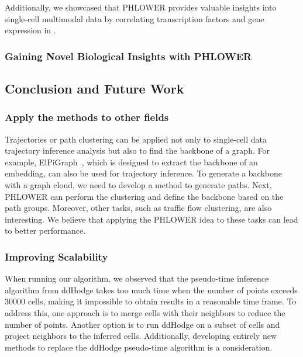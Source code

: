 Additionally, we showcased that PHLOWER provides valuable insights into single-cell multimodal data by correlating transcription factors and gene expression in .


\subsubsection{Gaining Novel Biological Insights with PHLOWER}

\subsection{Conclusion and Future Work}

\subsubsection{Apply the methods to other fields}
Trajectories or path clustering can be applied not only to single-cell data trajectory inference analysis but also to find the backbone of a graph. For example, ElPiGraph~\citep{albergante2020ElPiGraph}, which is designed to extract the backbone of an embedding, can also be used for trajectory inference. To generate a backbone with a graph cloud, we need to develop a method to generate paths. Next, PHLOWER can perform the clustering and define the backbone based on the path groups. Moreover, other tasks, such as traffic flow clustering\citep{kim2015spatial}, are also interesting. We believe that applying the PHLOWER idea to these tasks can lead to better performance.



\subsubsection{Improving Scalability}
When running our algorithm, we observed that the pseudo-time inference algorithm from ddHodge takes too much time when the number of points exceeds \num{30000} cells, making it impossible to obtain results in a reasonable time frame. To address this, one approach is to merge cells with their neighbors to reduce the number of points. Another option is to run ddHodge on a subset of cells and project neighbors to the inferred cells. Additionally, developing entirely new methods to replace the ddHodge pseudo-time algorithm is a consideration.

